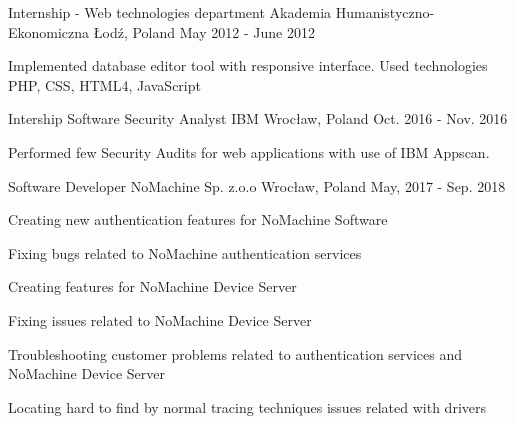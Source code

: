 

\begin{cventries}

  \cventry
    {Internship - Web technologies department} %
    {Akademia Humanistyczno-Ekonomiczna} %
    {Łodź, Poland} %
    {May 2012 - June 2012} %
    {
      \begin{cvitems} %
        \item {Implemented database editor tool with responsive interface. Used technologies PHP, CSS, HTML4, JavaScript} 
      \end{cvitems}
    }

  \cventry
    {Intership Software Security Analyst} %
    {IBM} %
    {Wrocław, Poland} %
    {Oct. 2016 - Nov. 2016} %
    {
      \begin{cvitems} %
        \item {Performed few Security Audits for web applications with use of IBM Appscan.}
      \end{cvitems}
    }

  \cventry
    {Software Developer} %
    {NoMachine Sp. z.o.o} %
    {Wrocław, Poland} %
    {May, 2017 - Sep. 2018} %
    {
      \begin{cvitems} %
        \item {Creating new authentication features for NoMachine Software}
        \item {Fixing bugs related to NoMachine authentication services}
        \item {Creating features for NoMachine Device Server}
        \item {Fixing issues related to NoMachine Device Server}
        \item {Troubleshooting customer problems related to authentication services and NoMachine Device Server}
        \item {Locating hard to find by normal tracing techniques issues related with drivers}
      \end{cvitems}
    }


\end{cventries}

